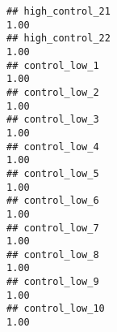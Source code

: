 \documentclass[
]{article}
\begin{document}
\begin{verbatim}
## high_control_21                                                                                                                                                                                                               1.00
## high_control_22                                                                                                                                                                                                               1.00
## control_low_1                                                                                                                                                                                                                 1.00
## control_low_2                                                                                                                                                                                                                 1.00
## control_low_3                                                                                                                                                                                                                 1.00
## control_low_4                                                                                                                                                                                                                 1.00
## control_low_5                                                                                                                                                                                                                 1.00
## control_low_6                                                                                                                                                                                                                 1.00
## control_low_7                                                                                                                                                                                                                 1.00
## control_low_8                                                                                                                                                                                                                 1.00
## control_low_9                                                                                                                                                                                                                 1.00
## control_low_10                                                                                                                                                                                                                1.00

\end{verbatim}
\end{document}
